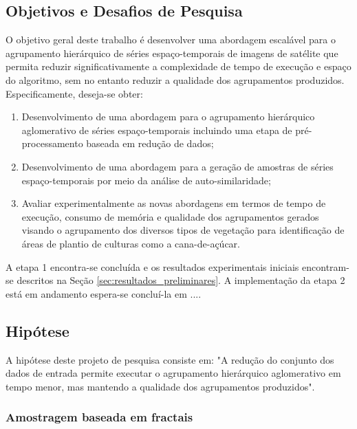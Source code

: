 \subsection{Objetivos e Desafios de Pesquisa}
	\label{subsec:objetivos}

O objetivo geral deste trabalho é desenvolver uma abordagem escalável para o
agrupamento hierárquico de séries espaço-temporais de imagens de satélite que
permita reduzir significativamente a complexidade de tempo de execução e espaço
do algoritmo, sem no entanto reduzir a qualidade dos agrupamentos produzidos.
Especificamente, deseja-se obter:

\begin{enumerate}
    \item Desenvolvimento de uma abordagem para o agrupamento hierárquico
		aglomerativo de séries espaço-temporais incluindo uma etapa de
		pré-processamento baseada em redução de dados;

    \item Desenvolvimento de uma abordagem para a geração de amostras de séries
		espaço-temporais por meio da análise de auto-similaridade;	
    
    \item Avaliar experimentalmente as novas abordagens em termos de tempo de
		execução, consumo de memória e qualidade dos agrupamentos gerados visando o
		agrupamento dos diversos tipos de vegetação para identificação de áreas de
		plantio de culturas como a cana-de-açúcar.
\end{enumerate}

A etapa 1 encontra-se concluída e os resultados experimentais iniciais
encontram-se descritos na Seção \ref{sec:resultados_preliminares}. A
implementação da etapa 2 está em andamento espera-se concluí-la em .... 
	
\subsection{Hipótese}
	\label{subsec:hipotese}

A hipótese deste projeto de pesquisa consiste em: "A redução do conjunto dos
dados de entrada permite executar o agrupamento hierárquico aglomerativo em
tempo menor, mas mantendo a qualidade dos agrupamentos produzidos".

\subsubsection{Amostragem baseada em fractais}

